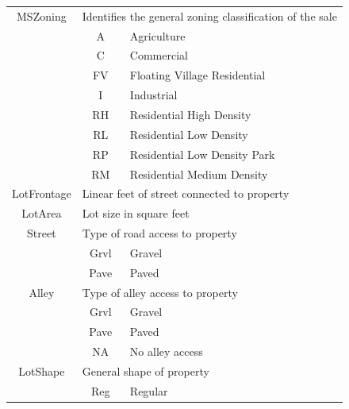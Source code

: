 \documentclass[11pt]{scrartcl} %
\begin{document}
\begin{center}
\begin{tabular}{c c c c c c}
\hline
\multicolumn{2}{|c}{MSZoning} & \multicolumn{4}{l|}{Identifies the general zoning classification of the sale}\\ 
\multicolumn{2}{|c}{} & \multicolumn{1}{c}{A} & \multicolumn{3}{l|}{Agriculture}\\
\multicolumn{2}{|c}{} & \multicolumn{1}{c}{C} & \multicolumn{3}{l|}{Commercial}\\
\multicolumn{2}{|c}{} & \multicolumn{1}{c}{FV} & \multicolumn{3}{l|}{Floating Village Residential}\\
\multicolumn{2}{|c}{} & \multicolumn{1}{c}{I} & \multicolumn{3}{l|}{Industrial}\\
\multicolumn{2}{|c}{} & \multicolumn{1}{c}{RH} & \multicolumn{3}{l|}{Residential High Density}\\
\multicolumn{2}{|c}{} & \multicolumn{1}{c}{RL} & \multicolumn{3}{l|}{Residential Low Density}\\
\multicolumn{2}{|c}{} & \multicolumn{1}{c}{RP} & \multicolumn{3}{l|}{Residential Low Density Park}\\
\multicolumn{2}{|c}{} & \multicolumn{1}{c}{RM} & \multicolumn{3}{l|}{Residential Medium Density}\\
\hline	
\multicolumn{2}{|c}{LotFrontage} & \multicolumn{4}{l|}{Linear feet of street connected to property}\\
\hline
\multicolumn{2}{|c}{LotArea} & \multicolumn{4}{l|}{Lot size in square feet}\\
\hline
\multicolumn{2}{|c}{Street} & \multicolumn{4}{l|}{Type of road access to property}\\ 
\multicolumn{2}{|c}{} & \multicolumn{1}{c}{Grvl} & \multicolumn{3}{l|}{Gravel}\\
\multicolumn{2}{|c}{} & \multicolumn{1}{c}{Pave} & \multicolumn{3}{l|}{Paved}\\
\hline
\multicolumn{2}{|c}{Alley} & \multicolumn{4}{l|}{Type of alley access to property}\\ 
\multicolumn{2}{|c}{} & \multicolumn{1}{c}{Grvl} & \multicolumn{3}{l|}{Gravel}\\
\multicolumn{2}{|c}{} & \multicolumn{1}{c}{Pave} & \multicolumn{3}{l|}{Paved}\\
\multicolumn{2}{|c}{} & \multicolumn{1}{c}{NA} & \multicolumn{3}{l|}{No alley access}\\
\hline
\multicolumn{2}{|c}{LotShape} & \multicolumn{4}{l|}{General shape of property}\\ 
\multicolumn{2}{|c}{} & \multicolumn{1}{c}{Reg} & \multicolumn{3}{l|}{Regular}\\

\end{tabular}
\end{center}
\end{document}
